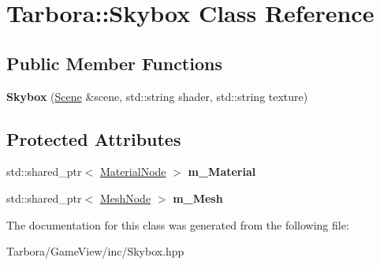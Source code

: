 \hypertarget{classTarbora_1_1Skybox}{}\section{Tarbora\+:\+:Skybox Class Reference}
\label{classTarbora_1_1Skybox}
\subsection*{Public Member Functions}
\begin{DoxyCompactItemize}
\item 
\mbox{\label{classTarbora_1_1Skybox_a0d3f11cbfe4e311bfa46c2e25e85ce6e}} 
{\bfseries Skybox} (\hyperlink{classTarbora_1_1Scene}{Scene} \&scene, std\+::string shader, std\+::string texture)
\end{DoxyCompactItemize}
\subsection*{Protected Attributes}
\begin{DoxyCompactItemize}
\item 
\mbox{\label{classTarbora_1_1Skybox_a56db0a920f4dd7eeb7359c9a41efb880}} 
std\+::shared\+\_\+ptr$<$ \hyperlink{classTarbora_1_1MaterialNode}{Material\+Node} $>$ {\bfseries m\+\_\+\+Material}
\item 
\mbox{\label{classTarbora_1_1Skybox_ab6b2807ead23afb5eccf8ca6b39b0290}} 
std\+::shared\+\_\+ptr$<$ \hyperlink{classTarbora_1_1MeshNode}{Mesh\+Node} $>$ {\bfseries m\+\_\+\+Mesh}
\end{DoxyCompactItemize}


The documentation for this class was generated from the following file\+:\begin{DoxyCompactItemize}
\item 
Tarbora/\+Game\+View/inc/Skybox.\+hpp\end{DoxyCompactItemize}
